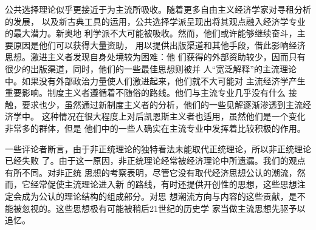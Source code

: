 公共选择理论似乎更接近于为主流所吸收。随着更多自由主义经济学家对寻租分析的发展，
以及新古典工具的运用，公共选择学派呈现出将其观点融入经济学专业的最大潜力。新奥地
利学派不大可能被吸收。然而，他们或许能够继续奋斗，主要原因是他们可以获得大量资助，
用以提供出版渠道和其他手段，借此影响经济思想。激进主义者发现自身处境较为困难：他
们获得的外部资助较少，因而只有很少的出版渠道，同时，他们的一些最佳思想则被并
人“宽泛解释”的主流理论中。如果没有外部政治力量使人们激进起来，他们就不大可能对
主流经济学产生重要影响。制度主义者遵循着不随俗的路线。他们与主流专业几乎没有什么
接触，要求也少，虽然通过新制度主义者的分析，他们的一些见解逐渐渗透到主流经济学中。
这种情况在很大程度上对后凯恩斯主义者也适用，虽然他们是一个变化非常多的群体，但是
他们中的一些人确实在主流专业中发挥着比较积极的作用。

一些评论者断言，由于非正统理论的独特看法未能取代正统理论，所以非正统理论已经失败
了。由于这一原因，非正统理论经常被经济理论中所遗漏。我们的观点有所不同。对非正统
思想的考察表明，尽管它没有取代经济思想公认的潮流，然而，它经常促使主流理论进入新
的路线，有时还提供开创性的思想，这些思想注定会成为公认的理论结构的组成部分。对思
想潮流方向与内容的这些贡献，是不能被忽视的。这些思想极有可能被稍后21世纪的历史学
家当做主流思想先驱予以追忆。

